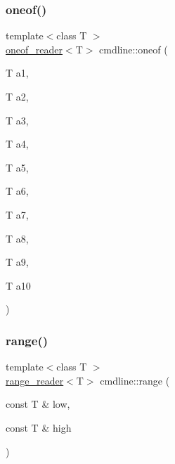 \subsubsection{\texorpdfstring{oneof()}{oneof()}\hspace{0.1cm}{\footnotesize\ttfamily [10/10]}}
{\footnotesize\ttfamily template$<$class T $>$ \\
\mbox{\hyperlink{structcmdline_1_1oneof__reader}{oneof\+\_\+reader}}$<$T$>$ cmdline\+::oneof (\begin{DoxyParamCaption}\item[{T}]{a1,  }\item[{T}]{a2,  }\item[{T}]{a3,  }\item[{T}]{a4,  }\item[{T}]{a5,  }\item[{T}]{a6,  }\item[{T}]{a7,  }\item[{T}]{a8,  }\item[{T}]{a9,  }\item[{T}]{a10 }\end{DoxyParamCaption})}

\mbox{\label{namespacecmdline_a254a4d230f6a0cd541273072ea2569c9}} 
\subsubsection{\texorpdfstring{range()}{range()}}
{\footnotesize\ttfamily template$<$class T $>$ \\
\mbox{\hyperlink{structcmdline_1_1range__reader}{range\+\_\+reader}}$<$T$>$ cmdline\+::range (\begin{DoxyParamCaption}\item[{const T \&}]{low,  }\item[{const T \&}]{high }\end{DoxyParamCaption})}

